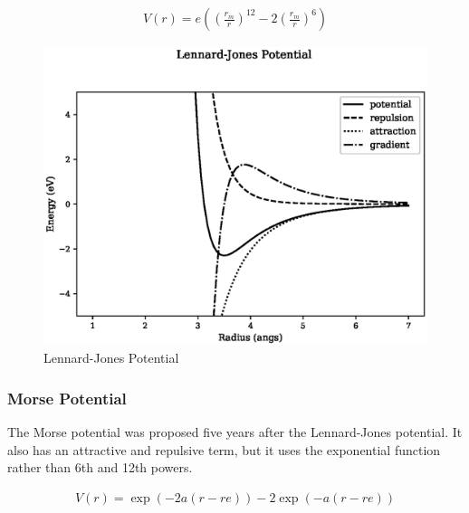 \begin{equation}
\begin{split}
V(r) = e \left(\left(\frac{r_m}{r}\right)^{12} - 2 \left(\frac{r_m}{r}\right)^6\right)
\end{split}
\label{eq:eqLennardJones}
\end{equation}

\begin{figure}[!htbp]
  \begin{center}
    \includegraphics[width=.6\linewidth]{chapters/interatomic_potential_fitting/plots_pair_potentials/lennard_jones.eps}
    \caption{Lennard-Jones Potential}
    \label{graph:lennardjonespot}
  \end{center}
\end{figure}



\FloatBarrier
\subsubsection{Morse Potential}
\label{section:Morse}

The Morse potential was proposed five years after the Lennard-Jones potential.  It also has an attractive and repulsive term, but it uses the exponential function rather than 6th and 12th powers.

\begin{equation}
\begin{split}
V(r) = \exp(-2 a (r - re)) - 2 \exp (-a(r - re))
\end{split}
\label{eq:eqLennardJones}
\end{equation}

